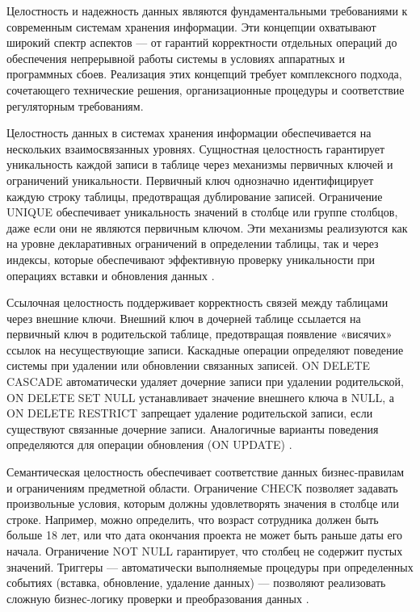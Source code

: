\documentclass{SibFU-docs}
\begin{document}
Целостность и надежность данных являются фундаментальными требованиями к современным системам хранения информации. Эти концепции охватывают широкий спектр аспектов — от гарантий корректности отдельных операций до обеспечения непрерывной работы системы в условиях аппаратных и программных сбоев. Реализация этих концепций требует комплексного подхода, сочетающего технические решения, организационные процедуры и соответствие регуляторным требованиям.


Целостность данных в системах хранения информации обеспечивается на нескольких взаимосвязанных уровнях. Сущностная целостность гарантирует уникальность каждой записи в таблице через механизмы первичных ключей и ограничений уникальности. Первичный ключ однозначно идентифицирует каждую строку таблицы, предотвращая дублирование записей. Ограничение UNIQUE обеспечивает уникальность значений в столбце или группе столбцов, даже если они не являются первичным ключом. Эти механизмы реализуются как на уровне декларативных ограничений в определении таблицы, так и через индексы, которые обеспечивают эффективную проверку уникальности при операциях вставки и обновления данных \cite{haerder1983}.

Ссылочная целостность поддерживает корректность связей между таблицами через внешние ключи. Внешний ключ в дочерней таблице ссылается на первичный ключ в родительской таблице, предотвращая появление «висячих» ссылок на несуществующие записи. Каскадные операции определяют поведение системы при удалении или обновлении связанных записей. ON DELETE CASCADE автоматически удаляет дочерние записи при удалении родительской, ON DELETE SET NULL устанавливает значение внешнего ключа в NULL, а ON DELETE RESTRICT запрещает удаление родительской записи, если существуют связанные дочерние записи. Аналогичные варианты поведения определяются для операции обновления (ON UPDATE) \cite{elmasri2016}.

Семантическая целостность обеспечивает соответствие данных бизнес-правилам и ограничениям предметной области. Ограничение CHECK позволяет задавать произвольные условия, которым должны удовлетворять значения в столбце или строке. Например, можно определить, что возраст сотрудника должен быть больше 18 лет, или что дата окончания проекта не может быть раньше даты его начала. Ограничение NOT NULL гарантирует, что столбец не содержит пустых значений. Триггеры — автоматически выполняемые процедуры при определенных событиях (вставка, обновление, удаление данных) — позволяют реализовать сложную бизнес-логику проверки и преобразования данных \cite{haerder1983}.
\end{document}
